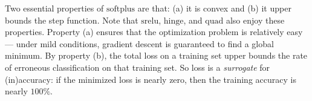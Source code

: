         Two essential properties of $\text{softplus}$ are that:
        (a) it is convex and
        (b) it upper bounds the step function.
        Note that $\text{srelu}$, $\text{hinge}$, and $\text{quad}$ also enjoy
        these properties.  Property (a) ensures that the optimization problem
        is relatively easy --- under mild conditions, gradient descent is
        guaranteed to find a global minimum.  By property (b), the total loss
        on a training set upper bounds the rate of erroneous classification on
        that training set.  So loss is a \emph{surrogate} for (in)accuracy: if
        the minimized loss is nearly zero, then the training accuracy is nearly
        $100\%$.



        \par\attnsam{}
        \par\attnsam{}
        \par{}
        \par{}

    \newpage


